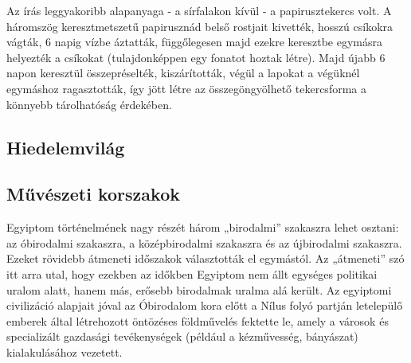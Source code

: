 	\begin{figure}[H]
		\centering
		\captionsetup{labelformat=empty}
		\caption{}
	\end{figure}

	Az írás leggyakoribb alapanyaga - a sírfalakon kívül - a papirusztekercs volt. A háromszög keresztmetszetű papirusznád belső rostjait kivették, hosszú csíkokra vágták, 6 napig vízbe áztatták, függőlegesen majd ezekre keresztbe egymásra helyezték a csíkokat (tulajdonképpen egy fonatot hoztak létre). Majd újabb 6 napon keresztül összepréselték, kiszárították, végül a lapokat a végüknél egymáshoz ragasztották, így jött létre az összegöngyölhető tekercsforma a könnyebb tárolhatóság érdekében.
	

\subsection*{Hiedelemvilág}

\subsection*{Művészeti korszakok}

Egyiptom történelmének nagy részét három „birodalmi” szakaszra lehet osztani: az óbirodalmi szakaszra, a középbirodalmi szakaszra és az újbirodalmi szakaszra. Ezeket rövidebb átmeneti időszakok választották el egymástól. Az „átmeneti” szó itt arra utal, hogy ezekben az időkben Egyiptom nem állt egységes politikai uralom alatt, hanem más, erősebb birodalmak uralma alá került. Az egyiptomi civilizáció alapjait jóval az Óbirodalom kora előtt a Nílus folyó partján letelepülő emberek által létrehozott öntözéses földművelés fektette le, amely a városok és specializált gazdasági tevékenységek (például a kézművesség, bányászat) kialakulásához vezetett.

